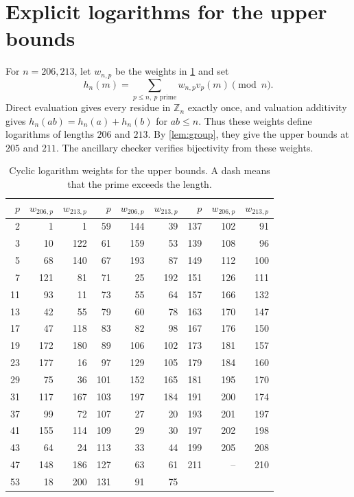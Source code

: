 \documentclass[11pt,reqno]{amsart}
\newcommand{\Z}{\mathbb Z}
\theoremstyle{definition}
\theoremstyle{remark}
\numberwithin{equation}{section}
\begin{document}
\section{Explicit logarithms for the upper bounds}\label{app:positive}
For $n=206,213$, let $w_{n,p}$ be the weights in \cref{tab:positive} and set
\[
 h_n(m)=\sum_{p\le n,\ p\text{ prime}}w_{n,p}v_p(m)\pmod n.
\]
Direct evaluation gives every residue in $\Z_n$ exactly once, and
valuation additivity gives $h_n(ab)=h_n(a)+h_n(b)$ for $ab\le n$.
Thus these weights define logarithms of lengths $206$ and $213$.
By \cref{lem:group}, they give the upper bounds at $205$ and $211$.
The ancillary checker verifies bijectivity from these weights.
\begin{table}[htbp]
\centering
\caption{Cyclic logarithm weights for the upper bounds. A dash means that the prime exceeds the length.}\label{tab:positive}
\renewcommand{\arraystretch}{1.05}
\setlength{\tabcolsep}{6pt}
\begin{tabular}{rrr@{\hspace{18pt}}rrr@{\hspace{18pt}}rrr}
\toprule
$p$&$w_{206,p}$&$w_{213,p}$&$p$&$w_{206,p}$&$w_{213,p}$&$p$&$w_{206,p}$&$w_{213,p}$\\
\midrule
2&1&1&59&144&39&137&102&91\\
3&10&122&61&159&53&139&108&96\\
5&68&140&67&193&87&149&112&100\\
7&121&81&71&25&192&151&126&111\\
11&93&11&73&55&64&157&166&132\\
13&42&55&79&60&78&163&170&147\\
17&47&118&83&82&98&167&176&150\\
19&172&180&89&106&102&173&181&157\\
23&177&16&97&129&105&179&184&160\\
29&75&36&101&152&165&181&195&170\\
31&117&167&103&197&184&191&200&174\\
37&99&72&107&27&20&193&201&197\\
41&155&114&109&29&30&197&202&198\\
43&64&24&113&33&44&199&205&208\\
47&148&186&127&63&61&211&--&210\\
53&18&200&131&91&75&&&\\
\bottomrule
\end{tabular}
\end{table}
\end{document}
